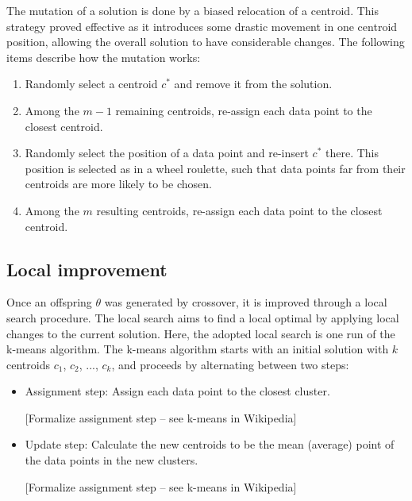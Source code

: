 The mutation of a solution is done by a biased relocation of a centroid. This strategy proved effective as it introduces some drastic movement in one centroid position, allowing the overall solution to have considerable changes. The following items describe how the mutation works:

\begin{enumerate}

	\item Randomly select a centroid $c^{*}$ and remove it from the solution.
	
	\item Among the $m-1$ remaining centroids, re-assign each data point to the closest centroid.
	
	\item Randomly select the position of a data point and re-insert $c^{*}$ there. This position is selected as in a wheel roulette, such that data points far from their centroids are more likely to be chosen.
	
	\item Among the $m$ resulting centroids, re-assign each data point to the closest centroid.
		
\end{enumerate}

\subsection{Local improvement}
Once an offspring $\theta$ was generated by crossover, it is improved through a local search procedure. The local search aims to find a local optimal by applying local changes to the current solution. Here, the adopted local search is one run of the k-means algorithm. The k-means algorithm starts with an initial solution with $k$ centroids $c_1$, $c_2$, ..., $c_k$, and proceeds by alternating between two steps:

\begin{itemize}

	\item Assignment step: Assign each data point to the closest cluster.
	
	[Formalize assignment step -- see k-means in Wikipedia]

	\item Update step: Calculate the new centroids to be the mean (average) point of the data points in the new clusters.
	
	[Formalize assignment step -- see k-means in Wikipedia]
		
\end{itemize}

